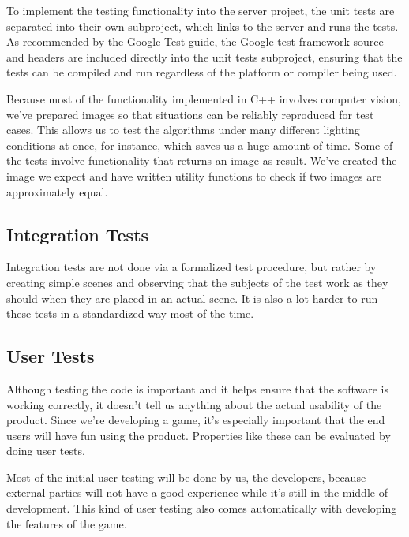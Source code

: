             To implement the testing functionality into the server project, 
            the unit tests are separated into their own subproject, which 
            links to the server and runs the tests. As recommended by the 
            Google Test guide, the Google test framework source and headers 
            are included directly into the unit tests subproject, ensuring 
            that the tests can be compiled and run regardless of the platform 
            or compiler being used.

            Because most of the functionality implemented in C++ involves
            computer vision, we've prepared images so that situations can be
            reliably reproduced for test cases. This allows us to test the
            algorithms under many different lighting conditions at once, for
            instance, which saves us a huge amount of time. Some of the tests
            involve functionality that returns an image as result. We've created
            the image we expect and have written utility functions to check if
            two images are approximately equal.
		
		\subsection{Integration Tests} \label{ssec:integrationtests}
			Integration tests are not done via a formalized test procedure, but 
			rather by creating simple scenes and observing that the subjects of 
			the test work as they should when they are placed in an actual 
			scene. It is also a lot harder to run these tests in a standardized 
			way most of the time.

		\subsection{User Tests}
			Although testing the code is important and it helps ensure that the
			software is working correctly, it doesn't tell us anything about the
			actual usability of the product. Since we're developing a game, it's
			especially important that the end users will have fun using the
			product. Properties like these can be evaluated by doing user tests.

			Most of the initial user testing will be done by us, the developers,
			because external parties will not have a good experience while it's
			still in the middle of development. This kind of user testing also
			comes automatically with developing the features of the game.

